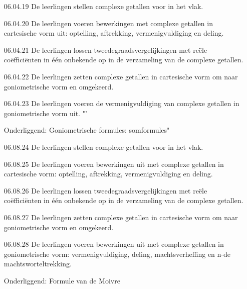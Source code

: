 \documentclass{ximera}
\begin{document}
	\author{Wim Obbels}
	\label{xim:complexe_getallen_xeindtermen}
    


    \begin{enumerate}
            \item  [06.04.19]  De leerlingen stellen complexe getallen voor in het vlak.	
            \item  [06.04.20]  De leerlingen voeren bewerkingen met complexe getallen in cartesische vorm uit: optelling, aftrekking, vermenigvuldiging en deling.	
            \item  [06.04.21]  De leerlingen lossen tweedegraadsvergelijkingen met reële coëfficiënten in één onbekende op in de verzameling van de complexe getallen.	
            \item  [06.04.22]  De leerlingen zetten complexe getallen in cartesische vorm om naar goniometrische vorm en omgekeerd.	
            \item  [06.04.23]  De leerlingen voeren de vermenigvuldiging van complexe getallen in goniometrische vorm uit.	"'

                    Onderliggend: Goniometrische formules: somformules"

    \end{enumerate}


    \begin{enumerate}
        \item 	[06.08.24]	De leerlingen stellen complexe getallen voor in het vlak.
        \item 	[06.08.25]	De leerlingen voeren bewerkingen uit met complexe getallen in cartesische vorm: optelling, aftrekking, vermenigvuldiging en deling.
        \item 	[06.08.26]	De leerlingen lossen tweedegraadsvergelijkingen met reële coëfficiënten in één onbekende op in de verzameling van de complexe getallen.
        \item 	[06.08.27]	De leerlingen zetten complexe getallen in cartesische vorm om naar goniometrische vorm en omgekeerd.
        \item 	[06.08.28]	De leerlingen voeren bewerkingen uit met complexe getallen in goniometrische vorm: vermenigvuldiging, deling, machtsverheffing en n-de machtsworteltrekking.
        
                Onderliggend:  Formule van de Moivre
    \end{enumerate}
\end{document}
